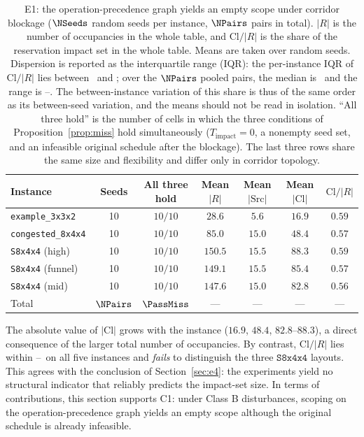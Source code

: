\begin{table}[t]
\centering
\caption{E1: the operation-precedence graph yields an empty scope under corridor blockage (\(\NSeeds\) random seeds per instance, \(\NPairs\) pairs in total).
\(|R|\) is the number of occupancies in the whole table, and \(\mathrm{Cl}/|R|\) is the share of the reservation impact set in the whole table. Means are taken over random seeds.
Dispersion is reported as the interquartile range (IQR): the per-instance IQR of \(\mathrm{Cl}/|R|\) lies
between \EoneFracIqrLo\ and \EoneFracIqrHi; over the \(\NPairs\) pooled pairs, the median is \EoneFracMed\ and
the range is \EoneFracMin--\EoneFracMax. The between-instance variation of this share is thus of the same order as its between-seed variation,
and the means should not be read in isolation.
``All three hold'' is the number of cells in which the three conditions of Proposition~\ref{prop:miss} hold simultaneously (\(T_{\mathrm{impact}}=0\),
a nonempty seed set, and an infeasible original schedule after the blockage). The last three rows share the same size and flexibility and differ only in corridor topology.}
\label{tab:e1}
\small
\begin{tabular}{@{}lcccccc@{}}
\toprule
Instance & Seeds & \makecell{All three\\hold} & Mean \(|R|\) & Mean \(|\mathrm{Src}|\)
 & Mean \(|\mathrm{Cl}|\) & \(\mathrm{Cl}/|R|\) \\
\midrule
\texttt{example\_3x3x2}   & 10 & \(10/10\) & \(28.6\)  & \(5.6\)  & \(16.9\) & \(0.59\) \\
\texttt{congested\_8x4x4} & 10 & \(10/10\) & \(85.0\)  & \(15.0\) & \(48.4\) & \(0.57\) \\
\texttt{S8x4x4} (high)    & 10 & \(10/10\) & \(150.5\) & \(15.5\) & \(88.3\) & \(0.59\) \\
\texttt{S8x4x4} (funnel)  & 10 & \(10/10\) & \(149.1\) & \(15.5\) & \(85.4\) & \(0.57\) \\
\texttt{S8x4x4} (mid)     & 10 & \(10/10\) & \(147.6\) & \(15.0\) & \(82.8\) & \(0.56\) \\
\midrule
Total & \(\NPairs\) & \(\PassMiss\) & --- & --- & --- & --- \\
\bottomrule
\end{tabular}
\end{table}

The absolute value of \(|\mathrm{Cl}|\) grows with the instance (\(16.9\), \(48.4\), \(82.8\)--\(88.3\)), a direct consequence of the larger total number of occupancies.
By contrast, \(\mathrm{Cl}/|R|\) lies within \EoneCloLo--\EoneCloHi\ on all five instances and \emph{fails} to distinguish the three \(\texttt{S8x4x4}\) layouts.
This agrees with the conclusion of Section~\ref{sec:e4}: the experiments yield no structural indicator that reliably predicts the impact-set size.
In terms of contributions, this section supports C1: under Class B disturbances, scoping on the operation-precedence graph yields an empty scope although the original schedule is already infeasible.

